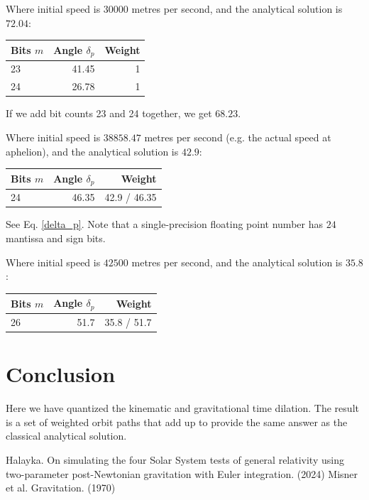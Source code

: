 \documentclass[12pt]{article}
\begin{document}
Where initial speed is $30000$ metres per second, and the analytical solution is $72.04$:
\begin{center}
\begin{tabular}{| l | r | r |}
  \hline
Bits $m$ & Angle $\delta_{p}$ & Weight\\
\hline
\hline
23 & 41.45 & 1\\
24 & 26.78 & 1 \\
  \hline  
\end{tabular}
\end{center}
If we add bit counts 23 and 24 together, we get $68.23$.

Where initial speed is $38858.47$ metres per second (e.g. the actual speed at aphelion), and the analytical solution is $42.9$:
\begin{center}
\begin{tabular}{| l | r | r |}
  \hline
Bits $m$ & Angle $\delta_{p}$ & Weight\\
\hline
\hline
24 & 46.35 & 42.9 / 46.35\\
  \hline  
\end{tabular}
\end{center}
See Eq. \ref{delta_p}.
Note that a single-precision floating point number has $24$ mantissa and sign bits.

Where initial speed is $42500$ metres per second, and the analytical solution is $35.8$:
\begin{center}
\begin{tabular}{| l | r | r |}
  \hline
Bits $m$ & Angle $\delta_{p}$ & Weight\\
\hline
\hline
26 & 51.7 & 35.8 / 51.7 \\
  \hline  
\end{tabular}
\end{center}





\section{Conclusion}

Here we have quantized the kinematic and gravitational time dilation.
The result is a set of weighted orbit paths that add up to provide the same answer as the classical analytical solution.





\begin{thebibliography}{9}


 Halayka. On simulating the four Solar System tests of general relativity using two-parameter post-Newtonian gravitation with Euler integration. (2024)
 Misner et al. Gravitation. (1970)

\end{thebibliography}
\end{document}
